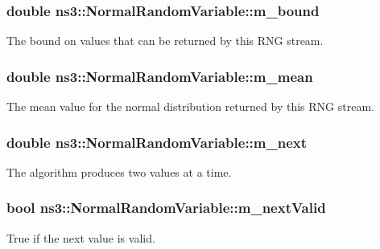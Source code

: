 \subsubsection[{\texorpdfstring{m\+\_\+bound}{m_bound}}]{\setlength{\rightskip}{0pt plus 5cm}double ns3\+::\+Normal\+Random\+Variable\+::m\+\_\+bound\hspace{0.3cm}{\ttfamily [private]}}\hypertarget{classns3_1_1NormalRandomVariable_ad173b135405ef0f2b7a2a94f7befe9fd}{}\label{classns3_1_1NormalRandomVariable_ad173b135405ef0f2b7a2a94f7befe9fd}
The bound on values that can be returned by this R\+NG stream. 
\subsubsection[{\texorpdfstring{m\+\_\+mean}{m_mean}}]{\setlength{\rightskip}{0pt plus 5cm}double ns3\+::\+Normal\+Random\+Variable\+::m\+\_\+mean\hspace{0.3cm}{\ttfamily [private]}}\hypertarget{classns3_1_1NormalRandomVariable_a6a4930dc7c730451277d9889f5b1a0d9}{}\label{classns3_1_1NormalRandomVariable_a6a4930dc7c730451277d9889f5b1a0d9}
The mean value for the normal distribution returned by this R\+NG stream. 
\subsubsection[{\texorpdfstring{m\+\_\+next}{m_next}}]{\setlength{\rightskip}{0pt plus 5cm}double ns3\+::\+Normal\+Random\+Variable\+::m\+\_\+next\hspace{0.3cm}{\ttfamily [private]}}\hypertarget{classns3_1_1NormalRandomVariable_af0098cd1acde38a476badc5a1e307a7c}{}\label{classns3_1_1NormalRandomVariable_af0098cd1acde38a476badc5a1e307a7c}
The algorithm produces two values at a time. 
\subsubsection[{\texorpdfstring{m\+\_\+next\+Valid}{m_nextValid}}]{\setlength{\rightskip}{0pt plus 5cm}bool ns3\+::\+Normal\+Random\+Variable\+::m\+\_\+next\+Valid\hspace{0.3cm}{\ttfamily [private]}}\hypertarget{classns3_1_1NormalRandomVariable_ae8b5000e4f79215ff7e52ef3d4ac1f18}{}\label{classns3_1_1NormalRandomVariable_ae8b5000e4f79215ff7e52ef3d4ac1f18}
True if the next value is valid. 
